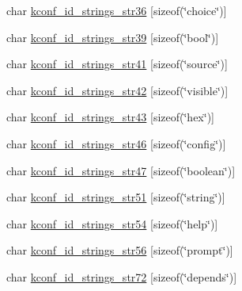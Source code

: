 \begin{DoxyCompactItemize}
char \hyperlink{structkconf__id__strings__t_a019e5bbd757c96fc4157515625a3160e}{kconf\-\_\-id\-\_\-strings\-\_\-str36} \mbox{[}sizeof(\char`\"{}choice\char`\"{})\mbox{]}
\item 
char \hyperlink{structkconf__id__strings__t_a44058724a8af93c5c676334ce9ebda55}{kconf\-\_\-id\-\_\-strings\-\_\-str39} \mbox{[}sizeof(\char`\"{}bool\char`\"{})\mbox{]}
\item 
char \hyperlink{structkconf__id__strings__t_aa92d1c31b0bd20d890cc8bd8c019f326}{kconf\-\_\-id\-\_\-strings\-\_\-str41} \mbox{[}sizeof(\char`\"{}source\char`\"{})\mbox{]}
\item 
char \hyperlink{structkconf__id__strings__t_a87e8039ecec7ecf18b34b99f54fd000e}{kconf\-\_\-id\-\_\-strings\-\_\-str42} \mbox{[}sizeof(\char`\"{}visible\char`\"{})\mbox{]}
\item 
char \hyperlink{structkconf__id__strings__t_a0928b7597b7587aba725dfc578e34b84}{kconf\-\_\-id\-\_\-strings\-\_\-str43} \mbox{[}sizeof(\char`\"{}hex\char`\"{})\mbox{]}
\item 
char \hyperlink{structkconf__id__strings__t_ae9c27153047d32e10da933987635a8e6}{kconf\-\_\-id\-\_\-strings\-\_\-str46} \mbox{[}sizeof(\char`\"{}config\char`\"{})\mbox{]}
\item 
char \hyperlink{structkconf__id__strings__t_a3a1405a3cddcd855a1f5650237573dc3}{kconf\-\_\-id\-\_\-strings\-\_\-str47} \mbox{[}sizeof(\char`\"{}boolean\char`\"{})\mbox{]}
\item 
char \hyperlink{structkconf__id__strings__t_a6209b6fe071d946a07a0b76109395e2f}{kconf\-\_\-id\-\_\-strings\-\_\-str51} \mbox{[}sizeof(\char`\"{}string\char`\"{})\mbox{]}
\item 
char \hyperlink{structkconf__id__strings__t_a4061e562de7f0b8840db1f60cf372fd6}{kconf\-\_\-id\-\_\-strings\-\_\-str54} \mbox{[}sizeof(\char`\"{}help\char`\"{})\mbox{]}
\item 
char \hyperlink{structkconf__id__strings__t_a23d0ff0b5d26f7dd641b89a9bf284ab7}{kconf\-\_\-id\-\_\-strings\-\_\-str56} \mbox{[}sizeof(\char`\"{}prompt\char`\"{})\mbox{]}
\item 
char \hyperlink{structkconf__id__strings__t_aca8f530e8dd61b4d08e6bd4905f8b2ab}{kconf\-\_\-id\-\_\-strings\-\_\-str72} \mbox{[}sizeof(\char`\"{}depends\char`\"{})\mbox{]}
\end{DoxyCompactItemize}


